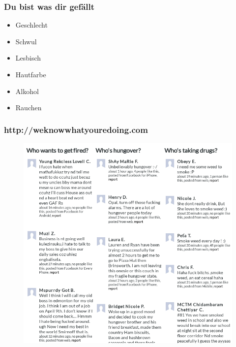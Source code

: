\documentclass[12pt]{beamer}
\begin{document}
\begin{frame}
  \frametitle{Du bist was dir gefällt}
  \begin{itemize}
    \item Geschlecht \textbf{}
    \item Schwul \textbf{}
    \item Lesbisch \textbf{}
    \item Hautfarbe \textbf{}
    \item Alkohol \textbf{}
    \item Rauchen \textbf{}
  \end{itemize}
\end{frame}

\begin{frame}
  \frametitle{http://weknowwhatyouredoing.com}
  \begin{figure}
    \includegraphics[height=0.7\textheight]{img/weknowwhatyouredoing.png}
  \end{figure}
\end{frame}
\end{document}
